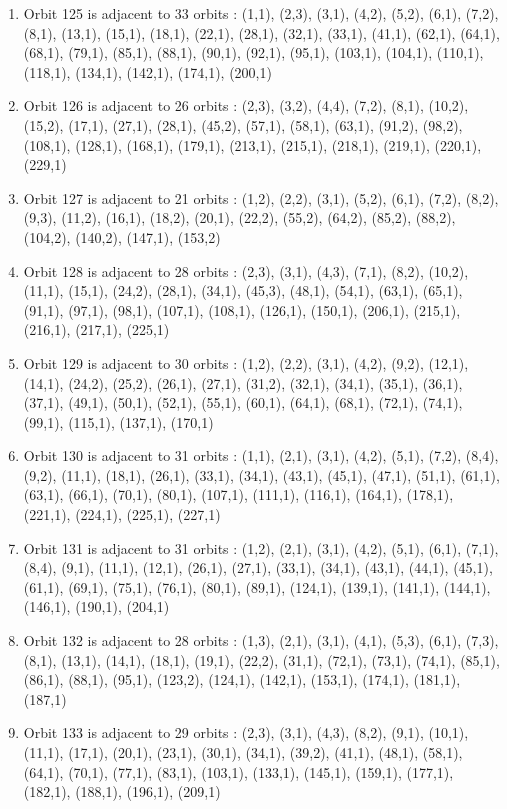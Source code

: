 \documentclass[12pt]{article}
\begin{document}
\begin{enumerate}
\item Orbit 125 is adjacent to 33 orbits : (1,1), (2,3), (3,1), (4,2), (5,2), (6,1), (7,2), (8,1), (13,1), (15,1), (18,1), (22,1), (28,1), (32,1), (33,1), (41,1), (62,1), (64,1), (68,1), (79,1), (85,1), (88,1), (90,1), (92,1), (95,1), (103,1), (104,1), (110,1), (118,1), (134,1), (142,1), (174,1), (200,1)
\item Orbit 126 is adjacent to 26 orbits : (2,3), (3,2), (4,4), (7,2), (8,1), (10,2), (15,2), (17,1), (27,1), (28,1), (45,2), (57,1), (58,1), (63,1), (91,2), (98,2), (108,1), (128,1), (168,1), (179,1), (213,1), (215,1), (218,1), (219,1), (220,1), (229,1)
\item Orbit 127 is adjacent to 21 orbits : (1,2), (2,2), (3,1), (5,2), (6,1), (7,2), (8,2), (9,3), (11,2), (16,1), (18,2), (20,1), (22,2), (55,2), (64,2), (85,2), (88,2), (104,2), (140,2), (147,1), (153,2)
\item Orbit 128 is adjacent to 28 orbits : (2,3), (3,1), (4,3), (7,1), (8,2), (10,2), (11,1), (15,1), (24,2), (28,1), (34,1), (45,3), (48,1), (54,1), (63,1), (65,1), (91,1), (97,1), (98,1), (107,1), (108,1), (126,1), (150,1), (206,1), (215,1), (216,1), (217,1), (225,1)
\item Orbit 129 is adjacent to 30 orbits : (1,2), (2,2), (3,1), (4,2), (9,2), (12,1), (14,1), (24,2), (25,2), (26,1), (27,1), (31,2), (32,1), (34,1), (35,1), (36,1), (37,1), (49,1), (50,1), (52,1), (55,1), (60,1), (64,1), (68,1), (72,1), (74,1), (99,1), (115,1), (137,1), (170,1)
\item Orbit 130 is adjacent to 31 orbits : (1,1), (2,1), (3,1), (4,2), (5,1), (7,2), (8,4), (9,2), (11,1), (18,1), (26,1), (33,1), (34,1), (43,1), (45,1), (47,1), (51,1), (61,1), (63,1), (66,1), (70,1), (80,1), (107,1), (111,1), (116,1), (164,1), (178,1), (221,1), (224,1), (225,1), (227,1)
\item Orbit 131 is adjacent to 31 orbits : (1,2), (2,1), (3,1), (4,2), (5,1), (6,1), (7,1), (8,4), (9,1), (11,1), (12,1), (26,1), (27,1), (33,1), (34,1), (43,1), (44,1), (45,1), (61,1), (69,1), (75,1), (76,1), (80,1), (89,1), (124,1), (139,1), (141,1), (144,1), (146,1), (190,1), (204,1)
\item Orbit 132 is adjacent to 28 orbits : (1,3), (2,1), (3,1), (4,1), (5,3), (6,1), (7,3), (8,1), (13,1), (14,1), (18,1), (19,1), (22,2), (31,1), (72,1), (73,1), (74,1), (85,1), (86,1), (88,1), (95,1), (123,2), (124,1), (142,1), (153,1), (174,1), (181,1), (187,1)
\item Orbit 133 is adjacent to 29 orbits : (2,3), (3,1), (4,3), (8,2), (9,1), (10,1), (11,1), (17,1), (20,1), (23,1), (30,1), (34,1), (39,2), (41,1), (48,1), (58,1), (64,1), (70,1), (77,1), (83,1), (103,1), (133,1), (145,1), (159,1), (177,1), (182,1), (188,1), (196,1), (209,1)

\end{enumerate}
\end{document}
